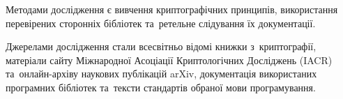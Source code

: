 \documentclass[a4paper,oneside,titlepage,14pt]{extarticle}
\begin{document}
		Методами дослідження є вивчення криптографічних принципів, використання перевірених сторонніх бібліотек та~ретельне слідування їх документації.\par
		
		Джерелами дослідження стали всесвітньо відомі книжки з~криптографії, матеріали сайту Міжнародної Асоціації Криптологічних Досліджень (IACR) та~онлайн-архіву наукових публікацій arXiv, документація використаних програмних бібліотек та~тексти стандартів обраної мови програмування.\par
	
		
		
		
		
		
		
		\newpage
		
\end{document}
